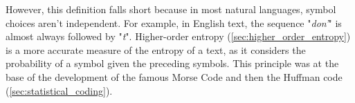 \noindent However, this definition falls short because in most natural languages, symbol choices aren't independent. For example, in English text, the sequence "\emph{don'}" is almost always followed by "\emph{t}". Higher-order entropy (\autoref{sec:higher_order_entropy}) is a more accurate measure of the entropy of a text, as it considers the probability of a symbol given the preceding symbols. This principle was at the base of the development of the famous Morse Code and then the Huffman code (\autoref{sec:statistical_coding}).
